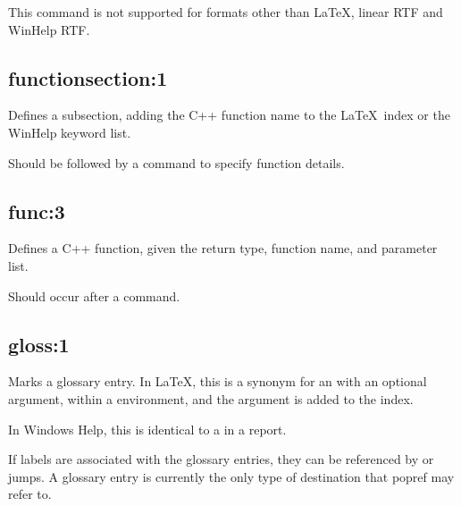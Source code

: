 This command is not supported for formats other than \LaTeX,
linear RTF and WinHelp RTF.


\subsection*{functionsection:1}\label{functionsection}

Defines a subsection, adding the C++ function name to the \LaTeX\ index or the
WinHelp keyword list.

Should be followed by a  command to specify function
details.

\subsection*{func:3}\label{func}

Defines a C++ function, given the return type, function name, and parameter list.

Should occur after a  command.

\subsection*{gloss:1}\label{gloss}

Marks a glossary entry. In \LaTeX, this is a synonym for an 
with an optional argument, within a  environment,
and the argument is added to the index.

In Windows Help, this is identical to a  in a report.

If labels are associated with the glossary entries, they can be referenced by
 or  jumps. A glossary entry is
currently the only type of destination that popref may refer to.

